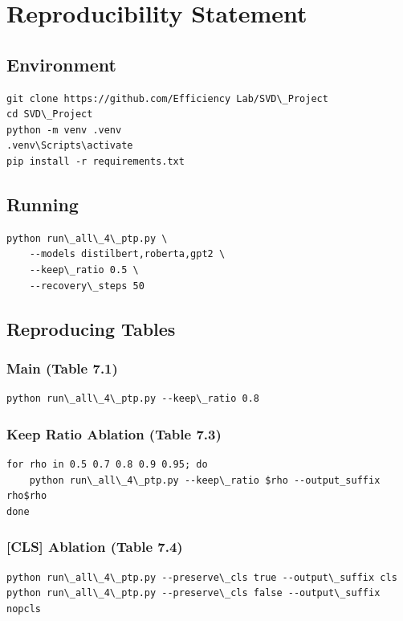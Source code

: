 
\section{Reproducibility Statement}

\subsection{Environment}

\begin{lstlisting}
git clone https://github.com/Efficiency Lab/SVD\_Project
cd SVD\_Project
python -m venv .venv
.venv\Scripts\activate
pip install -r requirements.txt
\end{lstlisting}

\subsection{Running}

\begin{lstlisting}
python run\_all\_4\_ptp.py \
    --models distilbert,roberta,gpt2 \
    --keep\_ratio 0.5 \
    --recovery\_steps 50
\end{lstlisting}

\subsection{Reproducing Tables}

\subsubsection{Main (Table 7.1)}
\begin{lstlisting}
python run\_all\_4\_ptp.py --keep\_ratio 0.8
\end{lstlisting}

\subsubsection{Keep Ratio Ablation (Table 7.3)}
\begin{lstlisting}
for rho in 0.5 0.7 0.8 0.9 0.95; do
    python run\_all\_4\_ptp.py --keep\_ratio $rho --output_suffix rho$rho
done
\end{lstlisting}

\subsubsection{[CLS] Ablation (Table 7.4)}
\begin{lstlisting}
python run\_all\_4\_ptp.py --preserve\_cls true --output\_suffix cls
python run\_all\_4\_ptp.py --preserve\_cls false --output\_suffix nopcls
\end{lstlisting}

